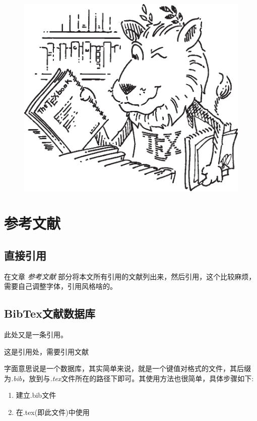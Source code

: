 \documentclass{ctexart} %
\begin{document}
            \begin{figure}[htbp]
                \centering
                \includegraphics[scale=0.5]{ctanlion.eps}
                
                
                \label{fig-lion2}
            \end{figure}
    \section{参考文献}
        \subsection{直接引用}
        在文章 \emph{参考文献} 部分将本文所有引用的文献列出来，然后引用，这个比较麻烦，需要自己调整字体，引用风格啥的。
        \subsection{BibTex文献数据库}

        此处又是一条引用\cite{王塞博2014无线传感器网络综述}。

        这是引用处，需要引用文献\cite{孙其博2010物联网}

        字面意思说是一个数据库，其实简单来说，就是一个键值对格式的文件，其后缀为\emph{.bib}，放到与\emph{.tex}文件所在的路径下即可。其使用方法也很简单，具体步骤如下:
        \begin{enumerate}
            \item 建立.bib文件
            \item 在.tex(即此文件)中使用
        \end{enumerate}

        \nocite{*}
        
\end{document}
